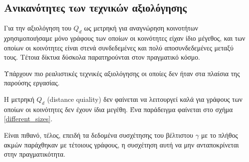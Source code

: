 \documentclass[12pt, letterpaper]{article}
\begin{document}
\subsection{Ανικανότητες των τεχνικών αξιολόγησης}

Για την αξιολόγηση του $Q_d$ ως μετρηκή για αναγνώρηση κοινοτήτων χρησιμοποιήσαμε 
μόνο γράφους των οποίων οι κοινότητες είχαν ίδιο μέγεθος, και των οποίων οι κοινότητες 
είναι στενά συνδεδεμένες και πολύ αποσυνδεδεμένες μεταξύ τους.
Τέτοια δίκτυα δύσκολα παρατηρούνται στον πραγματικό κόσμο. 

Υπάρχουν πιο ρεαλιστικές τεχνικές αξιολόγησης \cite{benchmark_realistic} οι οποίες δεν 
ήταν στα πλαίσια της παρούσης εργασίας. 


Η μετρηκή $Q_d$ (\textlatin{distance quiality}) δεν φαίνεται να λειτουργεί καλά για γράφους
των οποίων οι κοινότητες δεν έχουν ίδια μεγέθη. 
Ένα παράδειγμα φαίνεται στο σχήμα \ref{different_sizes}.  

Είναι πιθανό, τέλος, επειδή τα δεδομένα συσχέτησης του βέλτιστου $\gamma$ με το πλήθος 
ακμών παράχθηκαν με τέτοιους γράφους, η συσχέτηση αυτή να μην ανταποκρίνεται στην πραγματικότητα. 
\end{document}
